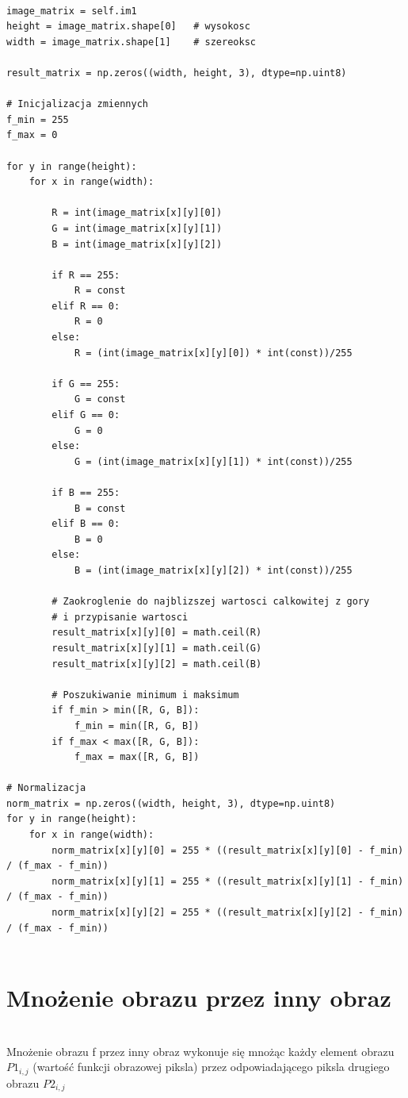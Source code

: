 \documentclass[final,a4paper,openany,12pt]{mwbk}
\begin{document}
\begin{lstlisting}[caption=Mnożenie obrazu barwowego przez zadaną liczbę]

image_matrix = self.im1
height = image_matrix.shape[0]   # wysokosc
width = image_matrix.shape[1]    # szereoksc

result_matrix = np.zeros((width, height, 3), dtype=np.uint8)

# Inicjalizacja zmiennych
f_min = 255
f_max = 0

for y in range(height):
    for x in range(width):  

        R = int(image_matrix[x][y][0])
        G = int(image_matrix[x][y][1])
        B = int(image_matrix[x][y][2])

        if R == 255:
            R = const
        elif R == 0:
            R = 0
        else:
            R = (int(image_matrix[x][y][0]) * int(const))/255 
        
        if G == 255:
            G = const
        elif G == 0:
            G = 0
        else:
            G = (int(image_matrix[x][y][1]) * int(const))/255 
        
        if B == 255:
            B = const
        elif B == 0:
            B = 0
        else:
            B = (int(image_matrix[x][y][2]) * int(const))/255 

        # Zaokroglenie do najblizszej wartosci calkowitej z gory
        # i przypisanie wartosci
        result_matrix[x][y][0] = math.ceil(R)
        result_matrix[x][y][1] = math.ceil(G)
        result_matrix[x][y][2] = math.ceil(B)

        # Poszukiwanie minimum i maksimum                
        if f_min > min([R, G, B]):
            f_min = min([R, G, B])
        if f_max < max([R, G, B]):
            f_max = max([R, G, B])

# Normalizacja
norm_matrix = np.zeros((width, height, 3), dtype=np.uint8)
for y in range(height):
    for x in range(width):
        norm_matrix[x][y][0] = 255 * ((result_matrix[x][y][0] - f_min) / (f_max - f_min))
        norm_matrix[x][y][1] = 255 * ((result_matrix[x][y][1] - f_min) / (f_max - f_min))
        norm_matrix[x][y][2] = 255 * ((result_matrix[x][y][2] - f_min) / (f_max - f_min))


\end{lstlisting}
\newpage

\section {Mnożenie obrazu przez inny obraz}
\hfill\\
\indent
Mnożenie obrazu f przez inny obraz wykonuje się mnożąc każdy element obrazu $P1_{i,j}$ (wartość funkcji obrazowej piksla) przez odpowiadającego piksla drugiego obrazu $P2_{i,j}$
\end{document}
